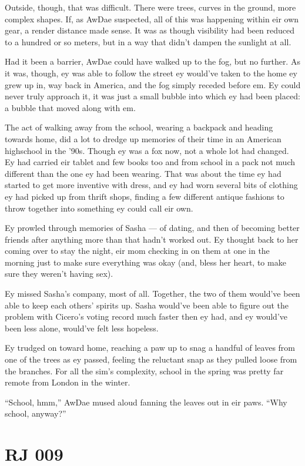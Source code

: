 Outside, though, that was difficult. There were trees, curves in the ground, more complex shapes. If, as AwDae suspected, all of this was happening within eir own gear, a render distance made sense. It was as though visibility had been reduced to a hundred or so meters, but in a way that didn't dampen the sunlight at all.

Had it been a barrier, AwDae could have walked up to the fog, but no further. As it was, though, ey was able to follow the street ey would've taken to the home ey grew up in, way back in America, and the fog simply receded before em. Ey could never truly approach it, it was just a small bubble into which ey had been placed: a bubble that moved along with em.

The act of walking away from the school, wearing a backpack and heading towards home, did a lot to dredge up memories of their time in an American highschool in the '90s. Though ey was a fox now, not a whole lot had changed. Ey had carried eir tablet and few books too and from school in a pack not much different than the one ey had been wearing. That was about the time ey had started to get more inventive with dress, and ey had worn several bits of clothing ey had picked up from thrift shops, finding a few different antique fashions to throw together into something ey could call eir own.

Ey prowled through memories of Sasha --- of dating, and then of becoming better friends after anything more than that hadn't worked out. Ey thought back to her coming over to stay the night, eir mom checking in on them at one in the morning just to make sure everything was okay (and, bless her heart, to make sure they weren't having sex).

Ey missed Sasha's company, most of all. Together, the two of them would've been able to keep each others' spirits up. Sasha would've been able to figure out the problem with Cicero's voting record much faster then ey had, and ey would've been less alone, would've felt less hopeless.

Ey trudged on toward home, reaching a paw up to snag a handful of leaves from one of the trees as ey passed, feeling the reluctant snap as they pulled loose from the branches. For all the sim's complexity, school in the spring was pretty far remote from London in the winter.

``School, hmm,'' AwDae mused aloud fanning the leaves out in eir paws. ``Why school, anyway?''

\chapter*{RJ 009}

